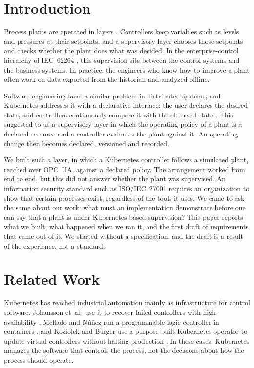 \documentclass[conference]{IEEEtran}
\begin{document}
\section{Introduction}

Process plants are operated in layers \cite{Skogestad2004}. Controllers keep variables such as levels and pressures at their setpoints, and a supervisory layer chooses those setpoints and checks whether the plant does what was decided. In the enterprise-control hierarchy of IEC~62264 \cite{IEC62264Std}, this supervision sits between the control systems and the business systems. In practice, the engineers who know how to improve a plant often work on data exported from the historian and analyzed offline.

Software engineering faces a similar problem in distributed systems, and Kubernetes addresses it with a declarative interface: the user declares the desired state, and controllers continuously compare it with the observed state \cite{Burns2016}. This suggested to us a supervisory layer in which the operating policy of a plant is a declared resource and a controller evaluates the plant against it. An operating change then becomes declared, versioned and recorded.

We built such a layer, in which a Kubernetes controller follows a simulated plant, reached over OPC~UA, against a declared policy. The arrangement worked from end to end, but this did not answer whether the plant was supervised. An information security standard such as ISO/IEC~27001 \cite{ISO27001} requires an organization to show that certain processes exist, regardless of the tools it uses. We came to ask the same about our work: what must an implementation demonstrate before one can say that a plant is under Kubernetes-based supervision? This paper reports what we built, what happened when we ran it, and the first draft of requirements that came out of it. We started without a specification, and the draft is a result of the experience, not a standard.

\section{Related Work}

Kubernetes has reached industrial automation mainly as infrastructure for control software. Johansson et~al.\ use it to recover failed controllers with high availability \cite{Johansson2022}, Mellado and Núñez run a programmable logic controller in containers \cite{Mellado2022}, and Koziolek and Burger use a purpose-built Kubernetes operator to update virtual controllers without halting production \cite{Koziolek2022}. In these cases, Kubernetes manages the software that controls the process, not the decisions about how the process should operate.
\end{document}
